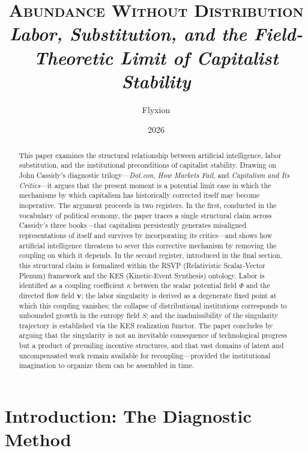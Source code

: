 \documentclass[11pt, a4paper]{article}
\title{%
  {\large\textsc{Abundance Without Distribution}}\\[3pt]
  {\small\itshape Labor, Substitution, and the Field-Theoretic Limit of Capitalist Stability}%
}
\author{Flyxion}
\date{2026}
\theoremstyle{plain}
\theoremstyle{definition}
\newcommand{\Phifield}{\Phi}
\newcommand{\vfield}{\mathbf{v}}
\newcommand{\Sfield}{S}
\newcommand{\coupling}{\kappa}
\begin{document}
\maketitle

\begin{abstract}
\noindent
This paper examines the structural relationship between artificial intelligence,
labor substitution, and the institutional preconditions of capitalist stability.
Drawing on John Cassidy's diagnostic trilogy---\emph{Dot.con},
\emph{How Markets Fail}, and \emph{Capitalism and Its Critics}---it argues that
the present moment is a potential limit case in which the mechanisms by which
capitalism has historically corrected itself may become inoperative. The
argument proceeds in two registers. In the first, conducted in the vocabulary
of political economy, the paper traces a single structural claim across
Cassidy's three books---that capitalism persistently generates misaligned
representations of itself and survives by incorporating its critics---and shows
how artificial intelligence threatens to sever this corrective mechanism by
removing the coupling on which it depends. In the second register, introduced
in the final section, this structural claim is formalized within the RSVP
(Relativistic Scalar-Vector Plenum) framework and the KES (Kinetic-Event
Synthesis) ontology. Labor is identified as a coupling coefficient $\coupling$
between the scalar potential field $\Phifield$ and the directed flow field
$\vfield$; the labor singularity is derived as a degenerate fixed point at
which this coupling vanishes; the collapse of distributional institutions
corresponds to unbounded growth in the entropy field $\Sfield$; and the
inadmissibility of the singularity trajectory is established via the KES
realization functor. The paper concludes by arguing that the singularity is
not an inevitable consequence of technological progress but a product of
prevailing incentive structures, and that vast domains of latent and
uncompensated work remain available for recoupling---provided the institutional
imagination to organize them can be assembled in time.
\end{abstract}

\newpage
\tableofcontents
\newpage

\section{Introduction: The Diagnostic Method}
\end{document}
